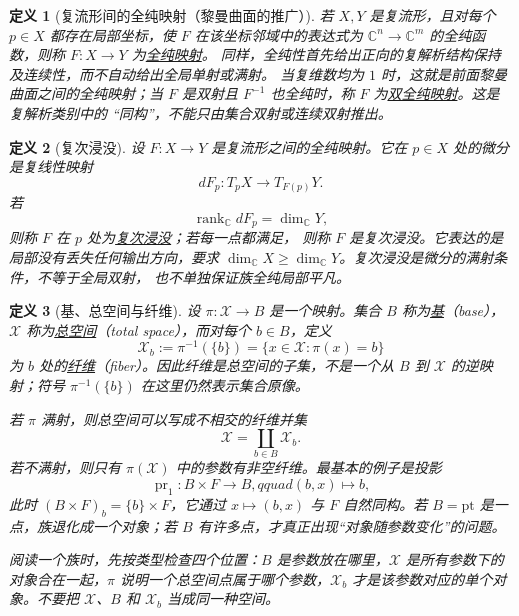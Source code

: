 \documentclass[UTF8,fontset=none,a4paper,11pt]{ctexart}
\theoremstyle{foundation-definition}
\newtheorem{definition}{定义}[section]
\theoremstyle{foundation-theorem}
\theoremstyle{foundation-proposition}
\theoremstyle{foundation-example}
\theoremstyle{foundation-remark}
\theoremstyle{foundation-theorem}
\newcommand{\C}{\mathbb C}
\newcommand{\term}[2]{\hyperref[#1]{#2}}
\begin{document}
\begin{definition}[复流形间的全纯映射（黎曼曲面的推广）]\label{def:complex-holomorphic-map}
若 \(X,Y\) 是复流形，且对每个 \(p\in X\) 都存在局部坐标，使 \(F\) 在该坐标邻域中的表达式为
\(\C^n\to\C^m\) 的全纯函数，则称 \(F:X\to Y\) 为\term{def:complex-holomorphic-map}{全纯映射}。
同样，全纯性首先给出正向的复解析结构保持及连续性，而不自动给出全局单射或满射。
当复维数均为 \(1\) 时，这就是前面黎曼曲面之间的全纯映射；当 \(F\) 是双射且
\(F^{-1}\) 也全纯时，称 \(F\) 为\term{def:biholomorphic}{双全纯映射}。这是复解析类别中的
“同构”，不能只由集合双射或连续双射推出。
\end{definition}

\begin{definition}[复次浸没]\label{def:complex-submersion}
设 \(F:X\to Y\) 是复流形之间的全纯映射。它在 \(p\in X\) 处的微分是复线性映射
\[
dF_p:T_pX\longrightarrow T_{F(p)}Y.
\]
若
\[
\operatorname{rank}_{\mathbb C}dF_p=\dim_{\mathbb C}Y,
\]
则称 \(F\) 在 \(p\) 处为\term{def:complex-submersion}{复次浸没}；若每一点都满足，
则称 \(F\) 是复次浸没。它表达的是局部没有丢失任何输出方向，要求
\(\dim_{\mathbb C}X\geq\dim_{\mathbb C}Y\)。复次浸没是微分的满射条件，不等于全局双射，
也不单独保证族全纯局部平凡。
\end{definition}

\begin{definition}[基、总空间与纤维]\label{def:base-fiber}
设 \(\pi:\mathcal X\to B\) 是一个映射。集合 \(B\) 称为\term{def:base-fiber}{基}（base），\(\mathcal X\) 称为\term{def:base-fiber}{总空间}（total space），而对每个 \(b\in B\)，定义
\[
  \mathcal X_b:=\pi^{-1}(\{b\})
  =\{x\in\mathcal X:\pi(x)=b\}
\]
为 \(b\) 处的\term{def:base-fiber}{纤维}（fiber）。因此纤维是总空间的子集，不是一个从 \(B\) 到 \(\mathcal X\) 的逆映射；符号 \(\pi^{-1}(\{b\})\) 在这里仍然表示集合原像。

若 \(\pi\) 满射，则总空间可以写成不相交的纤维并集
\[
  \mathcal X=\coprod_{b\in B}\mathcal X_b.
\]
若不满射，则只有 \(\pi(\mathcal X)\) 中的参数有非空纤维。最基本的例子是投影
\[
  \operatorname{pr}_1:B\times F\to B,qquad (b,x)\longmapsto b,
\]
此时 \((B\times F)_b=\{b\}\times F\)，它通过 \(x\mapsto(b,x)\) 与 \(F\) 自然同构。若 \(B=\mathrm{pt}\) 是一点，族退化成一个对象；若 \(B\) 有许多点，才真正出现“对象随参数变化”的问题。

阅读一个族时，先按类型检查四个位置：\(B\) 是参数放在哪里，\(\mathcal X\) 是所有参数下的对象合在一起，\(\pi\) 说明一个总空间点属于哪个参数，\(\mathcal X_b\) 才是该参数对应的单个对象。不要把 \(\mathcal X\)、\(B\) 和 \(\mathcal X_b\) 当成同一种空间。
\end{definition}
\end{document}
